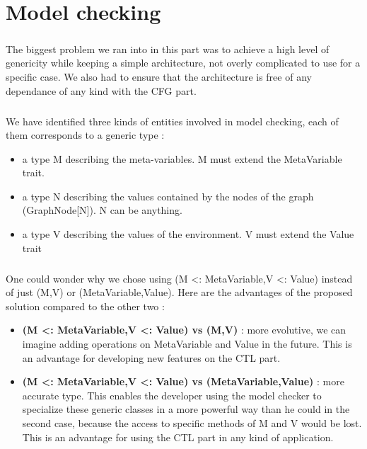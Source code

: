 \documentclass{report}
\begin{document}
\chapter{Model checking}

\paragraph{}
\hspace{4mm}The biggest problem we ran into in this part was to achieve a high level of genericity while keeping
a simple architecture, not overly complicated to use for a specific case. We also had to ensure that the architecture is
free of any dependance of any kind with the CFG part.

\paragraph{}
\hspace{4mm}We have identified three kinds of entities involved in model checking, each of them corresponds to a generic type :

\vspace{1.5mm}
\begin{itemize}
\item a type M describing the meta-variables. M must extend the MetaVariable trait.\vspace{1mm}
\item a type N describing the values contained by the nodes of the graph (GraphNode[N]). N can be anything.\vspace{1mm}
\item a type V describing the values of the environment. V must extend the Value trait\vspace{1mm}
\end{itemize}

\paragraph{}
\hspace{4mm}One could wonder why we chose using (M <: MetaVariable,V <: Value) instead of 
just (M,V) or (MetaVariable,Value). Here are the advantages of the proposed solution compared to the other two :

\vspace{1.5mm}
\begin{itemize}
\item \textbf{(M <: MetaVariable,V <: Value) vs (M,V)} : more evolutive, we can imagine adding
operations on MetaVariable and Value in the future. This is an advantage for developing new features on the CTL part.\vspace{1mm}
\item \textbf{(M <: MetaVariable,V <: Value) vs (MetaVariable,Value)} : more accurate type. This enables the developer using the model checker to
specialize these generic classes in a more powerful way than he could in the second case, because the access to specific methods of M and V would be lost.
This is an advantage for using the CTL part in any kind of application.\vspace{1mm}
\end{itemize}
\end{document}
